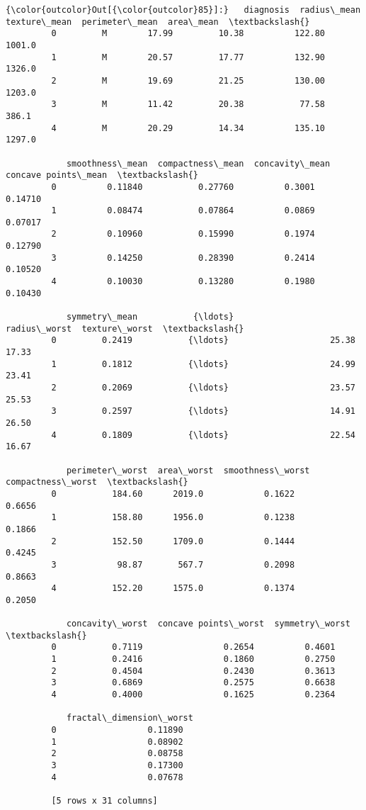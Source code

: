 \documentclass[11pt]{article}
\begin{document}
\begin{Verbatim}[commandchars=\\\{\}]
{\color{outcolor}Out[{\color{outcolor}85}]:}   diagnosis  radius\_mean  texture\_mean  perimeter\_mean  area\_mean  \textbackslash{}
         0         M        17.99         10.38          122.80     1001.0   
         1         M        20.57         17.77          132.90     1326.0   
         2         M        19.69         21.25          130.00     1203.0   
         3         M        11.42         20.38           77.58      386.1   
         4         M        20.29         14.34          135.10     1297.0   
         
            smoothness\_mean  compactness\_mean  concavity\_mean  concave points\_mean  \textbackslash{}
         0          0.11840           0.27760          0.3001              0.14710   
         1          0.08474           0.07864          0.0869              0.07017   
         2          0.10960           0.15990          0.1974              0.12790   
         3          0.14250           0.28390          0.2414              0.10520   
         4          0.10030           0.13280          0.1980              0.10430   
         
            symmetry\_mean           {\ldots}             radius\_worst  texture\_worst  \textbackslash{}
         0         0.2419           {\ldots}                    25.38          17.33   
         1         0.1812           {\ldots}                    24.99          23.41   
         2         0.2069           {\ldots}                    23.57          25.53   
         3         0.2597           {\ldots}                    14.91          26.50   
         4         0.1809           {\ldots}                    22.54          16.67   
         
            perimeter\_worst  area\_worst  smoothness\_worst  compactness\_worst  \textbackslash{}
         0           184.60      2019.0            0.1622             0.6656   
         1           158.80      1956.0            0.1238             0.1866   
         2           152.50      1709.0            0.1444             0.4245   
         3            98.87       567.7            0.2098             0.8663   
         4           152.20      1575.0            0.1374             0.2050   
         
            concavity\_worst  concave points\_worst  symmetry\_worst  \textbackslash{}
         0           0.7119                0.2654          0.4601   
         1           0.2416                0.1860          0.2750   
         2           0.4504                0.2430          0.3613   
         3           0.6869                0.2575          0.6638   
         4           0.4000                0.1625          0.2364   
         
            fractal\_dimension\_worst  
         0                  0.11890  
         1                  0.08902  
         2                  0.08758  
         3                  0.17300  
         4                  0.07678  
         
         [5 rows x 31 columns]
\end{Verbatim}
            
\end{document}
